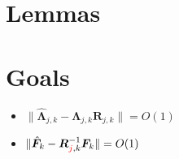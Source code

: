 \documentclass{article}
\numberwithin{equation}{section}
\begin{document}










\clearpage
\section{Lemmas}


\section{Goals}
\begin{itemize}
	\item $\lVert \hat{\bm{\Lambda}}_{j,k} - \bm{\Lambda}_{j,k}\bm{R}_{j,k} \rVert = O(1)$
	\item $\lVert \hat{\bm{F}}_{k} - \bm{R}^{-1}_{\textcolor{red}{j},k}\bm{F}_{k} \rVert = O(1)$
\end{itemize}
\end{document}
